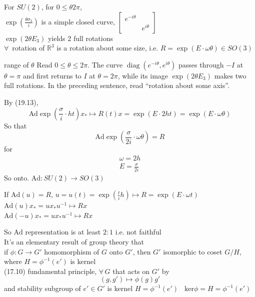 For $SU(2)$, for $0\leq \theta 2\pi$, \\
$\exp{ \left( \frac{\theta \sigma_3}{i} \right) } $ is a simple closed curve, $\left[ \begin{matrix} e^{-i\theta} & \\ & e^{i \theta} \end{matrix} \right]$ \\

$\exp{ \left( 2\theta E_3 \right)}$ yields 2 full rotations \\

$\forall \, $ rotation of $\mathbb{R}^3$ is a rotation about some size, i.e. $R = \exp{ (E\cdot \omega \theta)} \in SO(3)$

\begin{correction}{range of $\theta$}
Read $0\le\theta\le2\pi$. The curve $\operatorname{diag}(e^{-i\theta},e^{i\theta})$ passes through $-I$ at $\theta=\pi$ and first returns to $I$ at $\theta=2\pi$, while its image $\exp(2\theta E_3)$ makes two full rotations. In the preceding sentence, read ``rotation about some axis''.
\end{correction}

By (19.13), 
\[
\text{Ad}\exp{ \left( \frac{\sigma}{i} \cdot h t \right) }x_* \mapsto R(t) x = \exp{ (E\cdot 2h t ) } = \exp{ ( E\cdot \omega \theta ) }
\]
So that 
\[
\text{Ad}\exp{ \left( \frac{\sigma}{2i} \cdot \omega \theta \right) } = R
\]
for 
\[
\begin{aligned}
  \omega = 2h \\ 
  E = \frac{\sigma}{2i}
\end{aligned}
\]
So  onto.  $\text{Ad}: SU(2) \to SO(3)$

If $\text{Ad}(u) = R$, $u=u(t) = \exp{ \left( \frac{t}{i} h \right)} \mapsto R = \exp{ (E\cdot \omega t)}$
\phantom{If }$\text{Ad}(u)x_* = ux_*u^{-1} \mapsto Rx$ \\ 
\phantom{If }$\text{Ad}(-u)x_* = u x_*u^{-1} \mapsto Rx$

So $\text{Ad}$ representation is at least $2:1$ i.e. not faithful \\

It's an elementary result of group theory that \\
\phantom{It's } if $\phi : G \to G'$ homomorphism of $G$ onto $G'$, then $G'$ isomorphic to coset $G/H$, where $H=\phi^{-1}(e')$ is kernel \\

(17.10) fundamental principle, $\forall \, G$ that acts on $G'$ by 
\[
(g,g') \mapsto \phi(g)g'
\]
and stability subgroup of $e'\in G'$ is kernel $H= \phi^{-1}(e')$ \quad \quad \, $\text{ker}{\phi} = H = \phi^{-1}(e')$ \\

